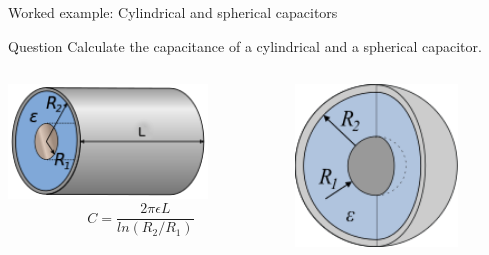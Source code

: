 
%
%

{
\problemslide

\begin{frame}{Worked example: Cylindrical and spherical capacitors}

  \begin{blockexmplque}{Question}
  Calculate the capacitance of a cylindrical and a spherical capacitor.\\
  \begin{columns}
    \begin{column}{0.60\textwidth}
     \begin{center}
       \includegraphics[width=0.75\textwidth]{./images/schematics/capacitors_cylindrical_1.png}\\
       \begin{equation*}
           C = \frac{2 \pi \epsilon L}{ln(R_2/R_1)}
       \end{equation*}
     \end{center}
    \end{column}
    \begin{column}{0.40\textwidth}
     \begin{center}
       \includegraphics[width=0.75\textwidth]{./images/schematics/capacitors_spherical_1.png}\\

\end{center}
\end{column}
\end{columns}
\end{blockexmplque}
\end{frame}}
